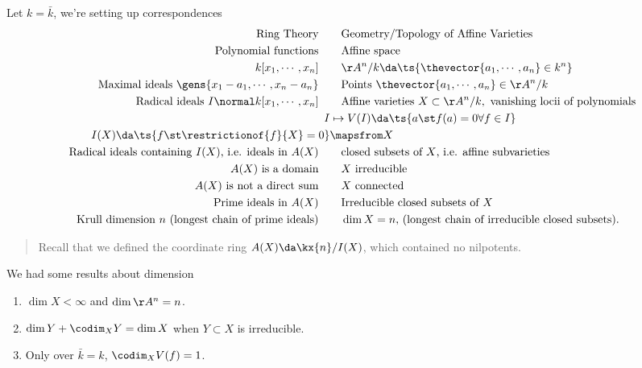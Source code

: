 Let \(k=\bar k\), we're setting up correspondences
\begin{align*}  
\text{Ring Theory} 
\quad&\quad 
\text{Geometry/Topology of Affine Varieties}
\\
\text{Polynomial functions} 
\quad&\quad 
\text{Affine space} 
\\
k[x_1, \cdots, x_n]
\quad&\quad 
\AA^n/k \da \ts{\thevector{a_1, \cdots, a_n} \in k^n } 
\\
\text{Maximal ideals } \gens{x_1 - a_1, \cdots, x_n - a_n} 
\quad&\quad 
\text{Points } \thevector{a_1, \cdots, a_n} \in \AA^n/k
\\
\text{Radical ideals } I\normal k[x_1, \cdots, x_n]
\quad&\quad 
\text{Affine varieties } X\subset  \AA^n/k, \text{ vanishing locii of polynomials} 
\\
I &\mapsto V(I) \da \ts{a\st f(a) = 0 \forall f\in I} \\
I(X) \da \ts{f \st \restrictionof{f}{X} = 0} &\mapsfrom X 
\\
\text{Radical ideals containing $I(X)$, i.e. ideals in $A(X)$} 
\quad&\quad 
\text{closed subsets of $X$, i.e. affine subvarieties}
\\
A(X) \text{ is a domain}
\quad&\quad 
\text{$X$ irreducible}
\\
\text{$A(X)$ is not a direct sum}
\quad&\quad 
\text{$X$ connected} 
\\
\text{Prime ideals in }A(X)
\quad&\quad 
\text{Irreducible closed subsets of }X
\\
\text{Krull dimension $n$ (longest chain of prime ideals)}
\quad&\quad 
\dim X = n,\, \text{(longest chain of irreducible closed subsets)}
.\end{align*}

\begin{quote}
Recall that we defined the coordinate ring \(A(X) \da \kx{n} / I(X)\),
which contained no nilpotents.
\end{quote}

We had some results about dimension

\begin{enumerate}
\def\labelenumi{\arabic{enumi}.}
\tightlist
\item
  \(\dim X<\infty\) and \(\dim \AA^n = n\).
\item
  \(\dim Y + \codim_X Y = \dim X\) when \(Y\subset X\) is irreducible.
\item
  Only over \(\bar k = k\), \(\codim_X V(f) = 1\).
\end{enumerate}

